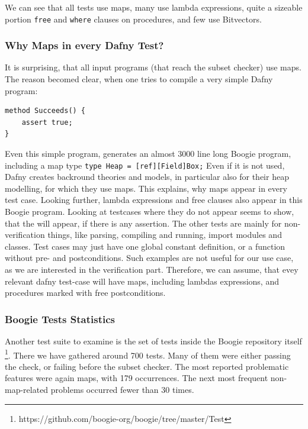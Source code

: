 \documentclass[11pt]{article}
\begin{document}
We can see that all tests use maps, many use lambda expressions,
quite a sizeable portion \texttt{free} and \texttt{where} clauses on procedures,
and few use Bitvectors.


\subsubsection{Why Maps in every Dafny Test?}

It is surprising, that all input programs (that reach the subset checker) use maps.
The reason becomed clear, when one tries to compile a very simple Dafny program:

\begin{verbatim}
method Succeeds() {
    assert true;
}
\end{verbatim}

Even this simple program, generates an almost 3000 line long Boogie program, including a map type
\texttt{type Heap = [ref][Field]Box;}
Even if it is not used, Dafny creates backround theories and models,
in particular also for their heap modelling, for which they use maps.
This explains, why maps appear in every test case.
Looking further, lambda expressions and free clauses also appear in this Boogie program.
Looking at testcases where they do not appear seems to show, that the will appear,
if there is any assertion.
The other tests are mainly for non-verification things, like parsing, compiling and running,
import modules and classes.
Test cases may just have one global constant definition, or a function without pre- and postconditions.
Such examples are not useful for our use case, as we are interested in the verification part.
Therefore, we can assume, that evey relevant dafny test-case will have maps, including lambdas expressions,
and procedures marked with free postconditions.


\subsubsection{Boogie Tests Statistics}

Another test suite to examine is the set of tests inside the Boogie repository itself
\footnote{https://github.com/boogie-org/boogie/tree/master/Test}.
There we have gathered around 700 tests.
Many of them were either passing the check,
or failing before the subset checker.
The most reported problematic features were again maps,
with 179 occurrences.
The next most frequent non-map-related problems occurred fewer than 30 times.
\end{document}
